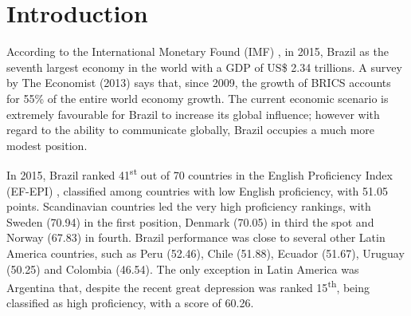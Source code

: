 \documentclass[twocolumn]{bmcart}%
\begin{document}



\pagestyle{plain}
\section*{Introduction}
According to the International Monetary Found (IMF) \cite{IMF2015}, in 2015, Brazil as the seventh largest economy in the world with a GDP of US\$ 2.34 trillions. A survey by The Economist (2013) says that, since 2009, the growth of BRICS accounts for 55\% of the entire world economy growth. The current economic scenario is extremely favourable for Brazil to increase its global influence; however with regard to the ability to communicate globally, Brazil occupies a much more modest position. 

In 2015, Brazil ranked 41\textsuperscript{st} out of 70 countries in the English Proficiency Index (EF-EPI) \cite{EF2015}, classified among countries with low English proficiency, with 51.05 points. Scandinavian countries led the very high proficiency rankings, with Sweden (70.94) in the first position, Denmark (70.05) in third the spot and Norway (67.83) in fourth. Brazil performance was close to several other Latin America countries, such as Peru (52.46), Chile (51.88), Ecuador (51.67), Uruguay (50.25) and Colombia (46.54). The only exception in Latin America was Argentina that, despite the recent great depression was ranked 15\textsuperscript{th}, being classified as high proficiency, with a score of 60.26.
\end{document}
